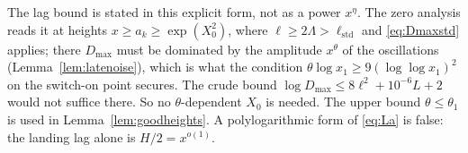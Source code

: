 The lag bound is stated in this explicit form, not as a power $x^{\eta}$. The zero analysis reads it at heights $x\ge a_k\ge
\exp(X_0^2)$, where $\ell\ge2\Lambda>\ell_{\mathrm{std}}$ and \eqref{eq:Dmaxstd} applies; there $D_{\max}$ must be dominated by the
amplitude $x^{\theta}$ of the oscillations (Lemma~\ref{lem:latenoise}), which is what the condition $\theta\log x_1\ge9(\log\log x_1)^2$
on the switch-on point secures. The crude bound $\log D_{\max}\le8\ell^2+10^{-6}L+2$ would not suffice there. So no
$\theta$-dependent $X_0$ is needed. The upper bound $\theta\le\theta_1$ is used in Lemma~\ref{lem:goodheights}. A polylogarithmic
form of \eqref{eq:La} is false: the landing lag alone is $H/2=x^{o(1)}$.

